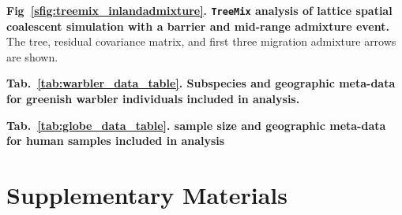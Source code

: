 \documentclass[10pt,letterpaper]{article}
\begin{document}
\label{treemix_inlandadmixture}
{\bf{Fig\ \ref{sfig:treemix_inlandadmixture}. \texttt{TreeMix} analysis of lattice spatial coalescent simulation with a barrier and mid-range admixture event.}}  
The tree, residual covariance matrix, and first three migration admixture arrows are shown.

\label{warbler_data_table}
{\bf{Tab.\ \ref{tab:warbler_data_table}. Subspecies and geographic meta-data for greenish warbler individuals included in analysis.}}

\label{globe_data_table}
{\bf{Tab.\ \ref{tab:globe_data_table}. sample size and geographic meta-data for human samples included in analysis}}

\newpage
\section*{Supplementary Materials}
\renewcommand{\thefigure}{S\arabic{figure}}
\setcounter{figure}{0}
\renewcommand{\thetable}{S\arabic{table}}
\setcounter{table}{0}
\renewcommand{\theequation}{S\arabic{table}}
\setcounter{equation}{0}

\setlength{\textwidth}{450pt}
\setlength{\oddsidemargin}{10pt}
\setlength{\evensidemargin}{10pt}
\lhead{}
\end{document}
